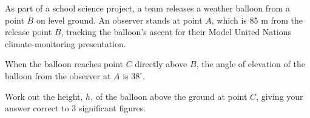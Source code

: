 \begin{question}
\noindent As part of a school science project, a team releases a weather balloon from a point $B$ on level ground. An observer stands at point $A$, which is 85 m from the release point $B$, tracking the balloon's ascent for their Model United Nations climate-monitoring presentation.

\noindent When the balloon reaches point $C$ directly above $B$, the angle of elevation of the balloon from the observer at $A$ is $38^\circ$.

\begin{center}
\end{center}

\noindent Work out the height, $h$, of the balloon above the ground at point $C$, giving your answer correct to 3 significant figures.

\vspace{5cm}

\begin{flushright}
\end{flushright}
\end{question}
